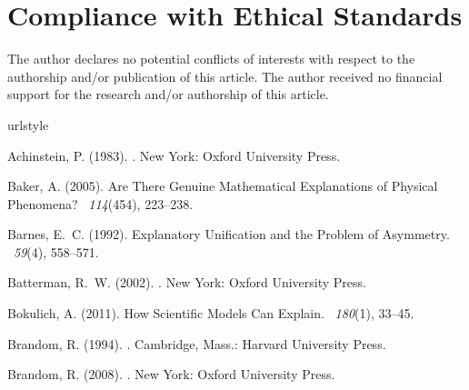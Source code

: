 \documentclass[natbib]{svjour3}                     %
\begin{document}
\section{Compliance with Ethical Standards}
The author declares no potential conflicts of interests with respect to the authorship and/or publication of this article. The author received no financial support for the research and/or authorship of this article.

\begin{thebibliography}{19}
\providecommand{\natexlab}[1]{#1}
\providecommand{\url}[1]{{#1}}
\providecommand{\urlprefix}{URL }
\expandafter\ifx\csname urlstyle\endcsname\relax
  \providecommand{\doi}[1]{DOI~\discretionary{}{}{}#1}\else
  \providecommand{\doi}{DOI~\discretionary{}{}{}\begingroup
  \urlstyle{rm}\Url}\fi
\providecommand{\eprint}[2][]{\url{#2}}

Achinstein, P. (1983).
.
\newblock New York: Oxford University Press.

Baker, A. (2005).
\newblock Are There Genuine Mathematical Explanations of Physical Phenomena?
~{\em 114\/}(454), 223--238.

Barnes, E.~C. (1992).
\newblock Explanatory Unification and the Problem of Asymmetry.
~{\em 59\/}(4), 558--571.

Batterman, R.~W. (2002).
.
\newblock New York: Oxford University Press.

Bokulich, A. (2011).
\newblock How Scientific Models Can Explain.
~{\em 180\/}(1), 33--45.

Brandom, R. (1994).
.
\newblock Cambridge, Mass.: Harvard University Press.

Brandom, R. (2008).
.
\newblock New York: Oxford University Press.


\end{thebibliography}
\end{document}
